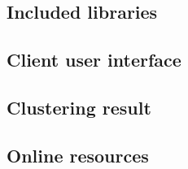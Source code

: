 \subsection{Included libraries}
    

\subsection{Client user interface}
    

\subsection{Clustering result}
    

\subsection{Online resources}
    
